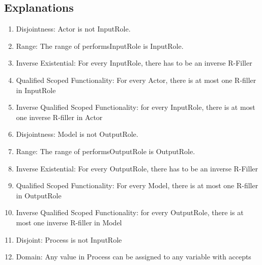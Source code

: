 \subsection{Explanations}
\label{exp:1c}
\begin{enumerate}
    \item  Disjointness: \textsf{Actor} is not \textsf{InputRole}.
    \item  Range: The range of \textsf{performsInputRole} is \textsf{InputRole}. 
    \item   Inverse Existential: For every \textsf{InputRole}, there has to be an inverse R-Filler %
    \item  Qualified Scoped Functionality: For every \textsf{Actor}, there is at most one R-filler in \textsf{InputRole} %
    \item  Inverse Qualified Scoped Functionality: for every \textsf{InputRole}, there is at most one inverse R-filler in \textsf{Actor} %
    \item  Disjointness: \textsf{Model} is not \textsf{OutputRole}.
    \item  Range: The range of \textsf{performsOutputRole} is \textsf{OutputRole}. 
    \item   Inverse Existential: For every \textsf{OutputRole}, there has to be an inverse R-Filler %
    \item  Qualified Scoped Functionality: For every \textsf{Model}, there is at most one R-filler in \textsf{OutputRole} %
    \item  Inverse Qualified Scoped Functionality: for every \textsf{OutputRole}, there is at most one inverse R-filler in \textsf{Model} %
    \item Disjoint: \textsf{Process} is not \textsf{InputRole}  %
    \item Domain: Any value in \textsf{Process} can be assigned to any variable with \textsf{accepts} %

\end{enumerate}
